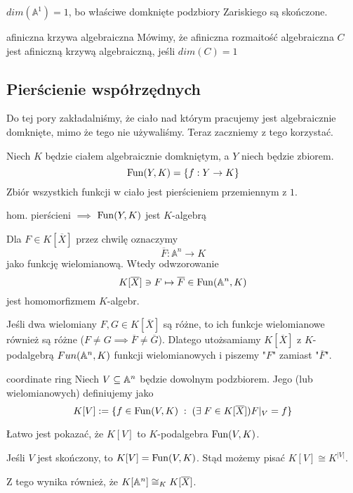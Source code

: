 \begin{example}
  $dim(\mathbb{A}^1)=1$, bo właściwe domknięte podzbiory Zariskiego są skończone.
\end{example}

\begin{definition}{afiniczna krzywa algebraiczna}{}
  Mówimy, że afiniczna rozmaitość algebraiczna $C$ jest afiniczną krzywą algebraiczną, jeśli $dim(C)=1$
\end{definition}

\subsection{Pierścienie współrzędnych}

Do tej pory zakładalniśmy, że ciało nad którym pracujemy jest algebraicznie domknięte, mimo że tego nie używaliśmy. Teraz zaczniemy z tego korzystać.

Niech $K$ będzie ciałem algebraicznie domkniętym, a $Y$ niech będzie zbiorem.
$$\operatorname{Fun}(Y, K)=\{f:Y\to K\}$$
Zbiór wszystkich funkcji w ciało jest pierścieniem przemiennym z $1$.

{\color{red}hom. pierścieni $\implies$ $\operatorname{Fun}(Y, K)$ jest $K$-algebrą}

Dla $F\in K[\overline{X}]$ przez chwilę oznaczymy 
$$\overline{F}:\mathbb{A}^n\to K$$
jako funkcję wielomianową. Wtedy odwzorowanie 
$$K[\overline{X}]\ni F\mapsto \overline{F}\in \operatorname{Fun}(\mathbb{A}^n, K)$$
jest homomorfizmem $K$-algebr.

Jeśli dwa wielomiany $F, G\in K[\overline{X}]$ są różne, to ich funkcje wielomianowe również są różne ($F\neq G\implies \overline{F}\neq\overline{G}$). Dlatego utożsamiamy $K[\overline{X}]$ z $K$-podalgebrą $Fun(\mathbb{A}^n, K)$ funkcji wielomianowych i piszemy "$F$" zamiast "$\overline{F}$".

\begin{definition}{coordinate ring}{}
  Niech $V\subseteq\mathbb{A}^n$ będzie dowolnym podzbiorem. Jego  (lub wielomianowych) definiujemy jako
  $$K[V]:=\{f\in \operatorname{Fun}(V, K)\;:\;(\exists\;F\in K[\overline{X}])F|_V = f\}$$
\end{definition}

Łatwo jest pokazać, że $K[V]$ to $K$-podalgebra $\operatorname{Fun}(V, K)$.

\begin{fact}{}{}
  Jeśli $V$ jest skończony, to $K[V]=\operatorname{Fun}(V, K)$. Stąd możemy pisać $K[V]\cong K^{|V|}$.

  Z tego wynika również, że $K[\mathbb{A}^n]\cong_K K[\overline{X}]$.
\end{fact}

